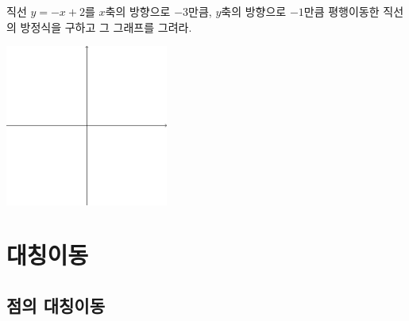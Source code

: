 \documentclass{oblivoir}
\begin{document}
%
\prob{}\label{ttranslate6}
직선 \(y=-x+2\)를 \(x\)축의 방향으로 \(-3\)만큼, \(y\)축의 방향으로 \(-1\)만큼 평행이동한 직선의 방정식을 구하고 그 그래프를 그려라.
\begin{center}
\bigskip\includegraphics[width=0.4\textwidth]{xyaxes}
\end{center}

\section{대칭이동}

\subsection{점의 대칭이동}
\end{document}
